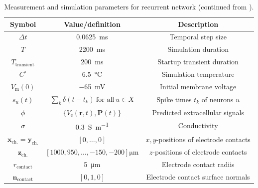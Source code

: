 \begin{table}[!htp]
\caption{ Measurement and simulation parameters for recurrent network (continued from ).}
\begin{center}
\begin{tabular}{|c|c|c|}
\hline
Symbol & Value/definition & Description \\
\hline
$\Delta t$ & \SI{0.0625}{\milli\second} & Temporal step size \\
$T$ & \SI{2200}{\milli\second} & Simulation duration \\
$T_\text{transient}$ &  \SI{200}{\milli\second} & Startup transient duration  \\
$C^\circ$ & \SI{6.5}{\celsius} & Simulation temperature \\
$V_\text{m}(0)$ & \SI{-65}{\milli\volt} & Initial membrane voltage \\
\hline
$s_u(t)$ & $\sum_k \delta(t - t_k)~\text{for all}~u \in X $ & Spike times $t_k$ of neurons $u$ \\
\hline
$\phi$ & $\{V_\text{e}(\mathbf{r}, t), \mathbf{P}(t) \} $ & Predicted extracellular signals \\ 
$\sigma$ & \SI{0.3}{\siemens\per\metre} & Conductivity \\
$\mathbf{x}_\text{ch.}=\mathbf{y}_\text{ch.}$ & $[0, \ldots, 0 ]$ & $x,y$-positions of electrode contacts \\
$\mathbf{z}_\text{ch.}$ & $[1000, 950, \ldots, -150, -200 ]\si{\micro\metre}$  & $z$-positions of electrode contacts \\
$r_\text{contact}$ & \SI{5}{\micro\metre} & Electrode contact radiis \\
$\mathbf{n}_\text{contact}$ & $[0, 1, 0]$ & Electrode contact surface normals \\
\hline
\end{tabular}
\end{center}
\label{tab:Ch-LFPy:MC-network-III}
\end{table}

